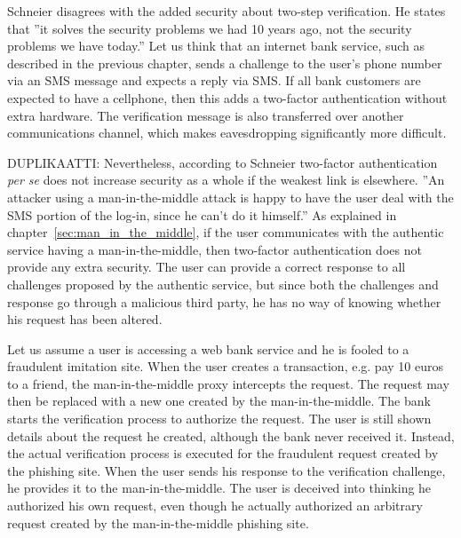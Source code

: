\documentclass[english,gradu]{tktltiki}
\begin{document}
            Schneier \cite{schneier_2factor_2005} disagrees with the added security about two-step verification. He states that ''it solves the security problems we had 10 years ago, not the security problems we have today.'' Let us think that an internet bank service, such as described in the previous chapter, sends a challenge to the user's phone number via an SMS message and expects a reply via SMS. If all bank customers are expected to have a cellphone, then this adds a two-factor authentication without extra hardware. The verification message is also transferred over another communications channel, which makes eavesdropping significantly more difficult.

             DUPLIKAATTI:
             Nevertheless, according to Schneier \cite{schneier_2factor_2005} two-factor authentication \emph{per se} does not increase security as a whole if the weakest link is elsewhere. ''An attacker using a man-in-the-middle attack is happy to have the user deal with the SMS portion of the log-in, since he can’t do it himself.'' \cite{schneier_2factor_2005} As explained in chapter~\ref{sec:man_in_the_middle}, if the user communicates with the authentic service having a man-in-the-middle, then two-factor authentication does not provide any extra security. The user can provide a correct response to all challenges proposed by the authentic service, but since both the challenges and response go through a malicious third party, he has no way of knowing whether his request has been altered.

             Let us assume a user is accessing a web bank service and he is fooled to a fraudulent imitation site. When the user creates a transaction, e.g. pay 10 euros to a friend, the man-in-the-middle proxy intercepts the request. The request may then be replaced with a new one created by the man-in-the-middle. The bank starts the verification process to authorize the request. The user is still shown details about the request he created, although the bank never received it. Instead, the actual verification process is executed for the fraudulent request created by the phishing site. When the user sends his response to the verification challenge, he provides it to the man-in-the-middle. The user is deceived into thinking he authorized his own request, even though he actually authorized an arbitrary request created by the man-in-the-middle phishing site.
\end{document}
